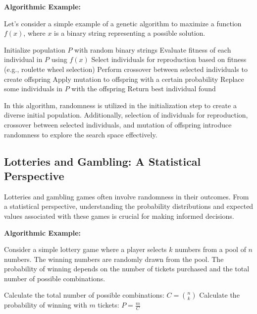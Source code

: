 \documentclass[12pt]{book} %
\begin{document}
\textbf{Algorithmic Example:}

Let's consider a simple example of a genetic algorithm to maximize a function \(f(x)\), where \(x\) is a binary string representing a possible solution.
\FloatBarrier
\begin{algorithm}[H]
\caption{Genetic Algorithm}
\begin{algorithmic}[1]
\State Initialize population $P$ with random binary strings
    \State Evaluate fitness of each individual in $P$ using $f(x)$
    \State Select individuals for reproduction based on fitness (e.g., roulette wheel selection)
    \State Perform crossover between selected individuals to create offspring
    \State Apply mutation to offspring with a certain probability
    \State Replace some individuals in $P$ with the offspring
\EndWhile
\State Return best individual found
\end{algorithmic}
\end{algorithm}
\FloatBarrier

In this algorithm, randomness is utilized in the initialization step to create a diverse initial population. Additionally, selection of individuals for reproduction, crossover between selected individuals, and mutation of offspring introduce randomness to explore the search space effectively.

\subsection{Lotteries and Gambling: A Statistical Perspective}

Lotteries and gambling games often involve randomness in their outcomes. From a statistical perspective, understanding the probability distributions and expected values associated with these games is crucial for making informed decisions.

\textbf{Algorithmic Example:}

Consider a simple lottery game where a player selects \(k\) numbers from a pool of \(n\) numbers. The winning numbers are randomly drawn from the pool. The probability of winning depends on the number of tickets purchased and the total number of possible combinations.
\FloatBarrier
\begin{algorithm}[H]
\caption{Lottery Probability Calculation}
\begin{algorithmic}[1]
\State Calculate the total number of possible combinations: \(C = \binom{n}{k}\)
\State Calculate the probability of winning with \(m\) tickets: \(P = \frac{m}{C}\)
\end{algorithmic}
\end{algorithm}
\FloatBarrier
\end{document}

